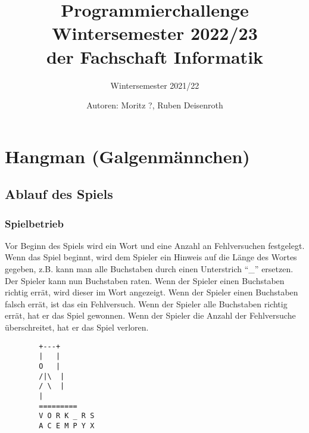 \documentclass[ngerman,accentcolor=3c,colorbacktitle,12pt]{tudaexercise}
\begin{document}
\title{Programmierchallenge Wintersemester 2022/23 \\ {\small der Fachschaft Informatik}}
\subtitle{Wintersemester 2021/22}
\author{Autoren: Moritz ?, Ruben Deisenroth}
\maketitle

\section*{Hangman (Galgenmännchen) \hyperref[footnote:1]{\footnotemark[1]}}
\subsection*{Ablauf des Spiels}
\subsubsection*{Spielbetrieb}
\begin{minipage}[t]{.7\textwidth}
    Vor Beginn des Spiels wird ein Wort und eine Anzahl an Fehlversuchen festgelegt. Wenn das Spiel beginnt, wird dem Spieler ein Hinweis auf die Länge des Wortes gegeben, z.B. kann man alle Buchstaben durch einen Unterstrich \enquote{\_} ersetzen. Der Spieler kann nun Buchstaben raten. Wenn der Spieler einen Buchstaben richtig errät, wird dieser im Wort angezeigt. Wenn der Spieler einen Buchstaben falsch errät, ist das ein Fehlversuch. Wenn der Spieler alle Buchstaben richtig errät, hat er das Spiel gewonnen. Wenn der Spieler die Anzahl der Fehlversuche überschreitet, hat er das Spiel verloren.
\end{minipage}%
\begin{minipage}[t]{.3\textwidth}%
    \centering%
    \captionsetup{type=figure}
    \begin{BVerbatim}
        +---+
        |   |
        O   |
        /|\  |
        / \  |
        |
        =========
        V O R K _ R S
        A C E M P Y X
    \end{BVerbatim}
\end{minipage}%
\end{document}
